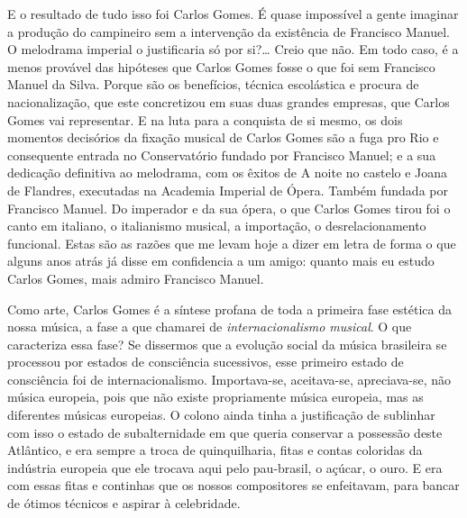E o resultado de tudo isso foi Carlos Gomes. É quase impossível a gente
imaginar a produção do campineiro sem a intervenção da existência de
Francisco Manuel. O melodrama imperial o justificaria só por si?\ldots{}
Creio que não. Em todo caso, é a menos provável das hipóteses que Carlos
Gomes fosse o que foi sem Francisco Manuel da Silva. Porque são os
benefícios, técnica escolástica e procura de nacionalização, que este
concretizou em suas duas grandes empresas, que Carlos Gomes vai
representar. E na luta para a conquista de si mesmo, os dois momentos
decisórios da fixação musical de Carlos Gomes são a fuga pro Rio e
consequente entrada no Conservatório fundado por Francisco Manuel; e a
sua dedicação definitiva ao melodrama, com os êxitos de A noite no
castelo e Joana de Flandres, executadas na Academia Imperial de Ópera.
Também fundada por Francisco Manuel. Do imperador e da sua ópera, o que
Carlos Gomes tirou foi o canto em italiano, o italianismo musical, a
importação, o desrelacionamento funcional. Estas são as razões que me
levam hoje a dizer em letra de forma o que alguns anos atrás já disse em
confidencia a um amigo: quanto mais eu estudo Carlos Gomes, mais admiro
Francisco Manuel.

Como arte, Carlos Gomes é a síntese profana de toda a primeira fase
estética da nossa música, a fase a que chamarei de \textit{internacionalismo
musical}. O que caracteriza essa fase? Se dissermos que a evolução
social da música brasileira se processou por estados de consciência
sucessivos, esse primeiro estado de consciência foi de
internacionalismo. Importava-se, aceitava-se, apreciava-se, não música
europeia, pois que não existe propriamente música europeia, mas as
diferentes músicas europeias. O colono ainda tinha a justificação de
sublinhar com isso o estado de subalternidade em que queria conservar a
possessão deste Atlântico, e era sempre a troca de quinquilharia, fitas
e contas coloridas da indústria europeia que ele trocava aqui pelo
pau-brasil, o açúcar, o ouro. E era com essas fitas e continhas que os
nossos compositores se enfeitavam, para bancar de ótimos técnicos e
aspirar à celebridade.

